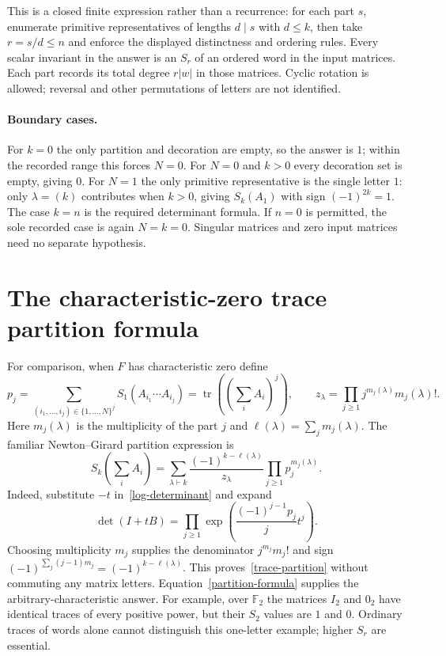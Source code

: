\documentclass[11pt]{article}
\newcommand{\tr}{\operatorname{tr}}
\begin{document}
This is a closed finite expression rather than a recurrence: for each
part $s$, enumerate primitive representatives of lengths $d\mid s$ with
$d\leq k$, then take $r=s/d\leq n$ and enforce the displayed distinctness
and ordering rules. Every scalar invariant in the answer is an $S_r$
of an ordered word in the input matrices. Each part records its total
degree $r|w|$ in those matrices. Cyclic rotation is allowed;
reversal and other permutations of letters are not identified.

\paragraph{Boundary cases.}
For $k=0$ the only partition and decoration are empty, so the answer is
$1$; within the recorded range this forces $N=0$.
For $N=0$ and $k>0$ every decoration set is empty, giving $0$.
For $N=1$ the only primitive representative is the single letter $1$:
only $\lambda=(k)$ contributes when $k>0$, giving $S_k(A_1)$ with sign
$(-1)^{2k}=1$. The case $k=n$ is the required determinant formula.
If $n=0$ is permitted, the sole recorded case is again $N=k=0$.
Singular matrices and zero input matrices need no separate hypothesis.

\section{The characteristic-zero trace partition formula}
For comparison, when $F$ has characteristic zero define
\[
 p_j=\sum_{(i_1,\ldots,i_j)\in\{1,\ldots,N\}^j}
                S_1(A_{i_1}\cdots A_{i_j})
     =\tr\left(\left(\sum_i A_i\right)^j\right),
 \qquad
 z_\lambda=\prod_{j\geq1}j^{m_j(\lambda)}m_j(\lambda)!.
\]
Here $m_j(\lambda)$ is the multiplicity of the part $j$ and
$\ell(\lambda)=\sum_jm_j(\lambda)$. The familiar Newton--Girard
partition expression is
\begin{equation}\label{trace-partition}
 S_k\left(\sum_i A_i\right)=
   \sum_{\lambda\vdash k}
    \frac{(-1)^{k-\ell(\lambda)}}{z_\lambda}
                  \prod_{j\geq1}p_j^{m_j(\lambda)}.
\end{equation}
Indeed, substitute $-t$ in~\eqref{log-determinant} and expand
\[
 \det(I+tB)=\prod_{j\geq1}
          \exp\left(\frac{(-1)^{j-1}p_j}{j}t^j\right).
\]
Choosing multiplicity $m_j$ supplies the denominator $j^{m_j}m_j!$ and
sign $(-1)^{\sum_j(j-1)m_j}=(-1)^{k-\ell(\lambda)}$.
This proves~\eqref{trace-partition} without commuting any matrix letters.
Equation~\eqref{partition-formula} supplies the arbitrary-characteristic
answer. For example, over $\mathbb F_2$ the matrices $I_2$ and $0_2$
have identical traces of every positive power, but their $S_2$ values are
$1$ and $0$. Ordinary traces of words alone cannot distinguish this
one-letter example; higher $S_r$ are essential.
\end{document}
